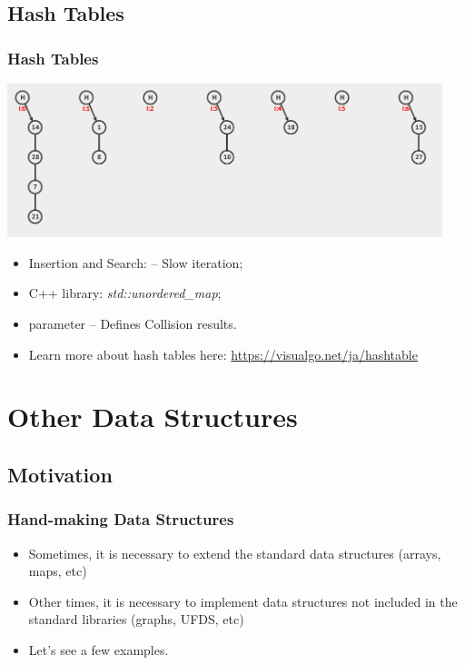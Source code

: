 \documentclass{beamer}
\begin{document}
\subsection{Hash Tables}
\begin{frame}[fragile]
  \frametitle{Hash Tables}

  \includegraphics[width=0.95\textwidth]{img/hash}

  \begin{itemize}
  \item Insertion and Search:  -- \alert{Slow iteration};
  \item C++ library: \emph{std::unordered\_map};
  \item {} parameter -- Defines Collision results.
  \item Learn more about hash tables here: \url{https://visualgo.net/ja/hashtable}
  \end{itemize}
\end{frame}

\section{Other Data Structures}
\subsection{Motivation}
\begin{frame}
  \frametitle{Hand-making Data Structures}

  \begin{itemize}
  \item Sometimes, it is necessary to extend the standard data structures
    (arrays, maps, etc)
    \bigskip

  \item Other times, it is necessary to implement data structures not
    included in the standard libraries (graphs, UFDS, etc)
    \bigskip

  \item Let's see a few examples.
  \end{itemize}
\end{frame}
\end{document}
